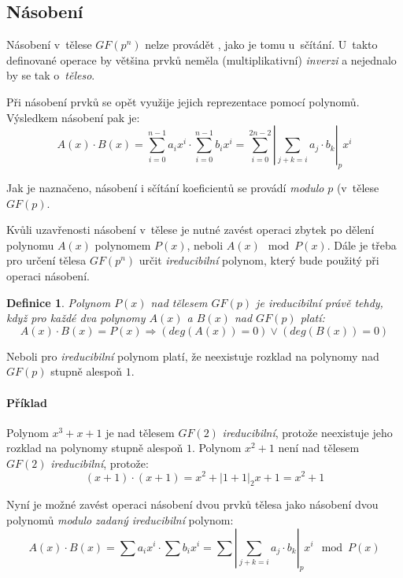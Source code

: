 \documentclass[thesis=M,czech,hidelinks]{FITthesis}[2012/06/26]
\newcommand{\0}{{\textcolor[gray]{0.80}{0}}}
\newtheorem{definice}{Definice}
\begin{document}
\subsection{Násobení}

Násobení v~tělese $GF(p^n)$ nelze provádět , jako je tomu
u~sčítání. U~takto definované operace by většina prvků neměla (multiplikativní)
\emph{inverzi} a nejednalo by se tak o~\emph{těleso}.

Při násobení prvků se opět využije jejich reprezentace pomocí polynomů.
Výsledkem násobení pak je:
$$
    A(x) \cdot B(x) = \sum_{i=0}^{n-1} a_i x^i \cdot \sum_{i=0}^{n-1} b_i x^i =
    \sum_{i=0}^{2n-2} \left|\sum_{j+k=i} a_j \cdot b_k\right|_p x^i
$$

Jak je naznačeno, násobení i sčítání koeficientů se provádí \emph{modulo} $p$
(v~tělese $GF(p)$.

Kvůli uzavřenosti násobení v~tělese je nutné zavést operaci zbytek po dělení
polynomu $A(x)$ polynomem $P(x)$, neboli $A(x) \mod P(x)$. Dále je třeba pro
určení tělesa $GF(p^n)$ určit \emph{ireducibilní} polynom, který bude použitý
při operaci násobení.

\begin{definice}
    Polynom $P(x)$ nad tělesem $GF(p)$ je \emph{ireducibilní} právě tehdy, když
    pro každé dva polynomy $A(x)$ a $B(x)$ nad $GF(p)$ platí:
    $$
        A(x) \cdot B(x) = P(x) \Rightarrow \left( deg(A(x)) = 0 \right) \lor
        \left( deg(B(x)) = 0 \right)
    $$
\end{definice}

Neboli pro \emph{ireducibilní} polynom platí, že neexistuje rozklad na polynomy
nad $GF(p)$ stupně alespoň $1$.

\paragraph{Příklad} Polynom $x^3+x+1$ je nad tělesem $GF(2)$
\emph{ireducibilní}, protože neexistuje jeho rozklad na polynomy stupně alespoň
$1$. Polynom $x^2+1$ není nad tělesem $GF(2)$ \emph{ireducibilní}, protože:
$$ (x+1)\cdot(x+1) = x^2 + \left|1+1\right|_2x + 1 = x^2+1 $$

Nyní je možné zavést operaci násobení dvou prvků tělesa jako násobení dvou
polynomů \emph{modulo} \emph{zadaný ireducibilní} polynom:
$$
    A(x) \cdot B(x) = \sum a_i x^i \cdot \sum b_i x^i =
    \sum \left|\sum_{j+k=i} a_j \cdot b_k\right|_p x^i \mod P(x)
$$
\end{document}

